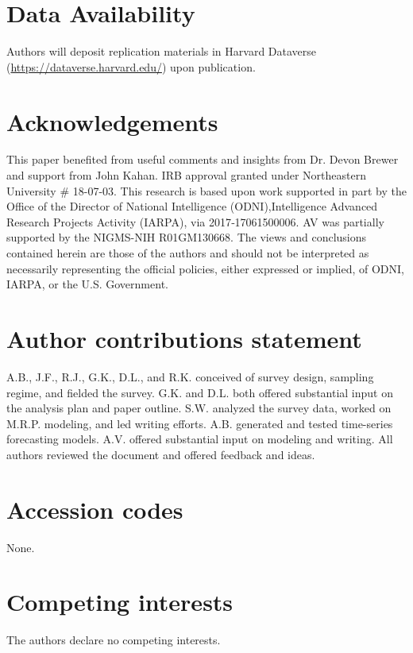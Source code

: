 \documentclass[fleqn,10pt]{wlscirep}
\begin{document}


\section*{Data Availability}
Authors will deposit replication materials in Harvard Dataverse (\url{https://dataverse.harvard.edu/}) upon publication. 






\section*{Acknowledgements}

This paper benefited from useful comments and insights from Dr. Devon Brewer and support from John Kahan. IRB approval granted under Northeastern University \# 18-07-03. This research is based upon work supported in part by the Office of the Director of National Intelligence (ODNI),Intelligence Advanced Research Projects Activity (IARPA), via 2017‐17061500006. AV was partially supported by the NIGMS-NIH R01GM130668. The views and conclusions contained herein are those of the authors and should not be interpreted as necessarily representing the official policies, either expressed or implied, of ODNI, IARPA, or the U.S. Government.

\section*{Author contributions statement}

A.B., J.F., R.J., G.K., D.L., and R.K. conceived of survey design, sampling regime, and fielded the survey. G.K. and D.L. both offered substantial input on the analysis plan and paper outline. S.W. analyzed the survey data, worked on M.R.P. modeling, and led writing efforts. A.B. generated and tested time-series forecasting models. A.V. offered substantial input on modeling and writing. All authors reviewed the document and offered feedback and ideas. 

\section*{Accession codes}
None.

\section*{Competing interests}

The authors declare no competing interests. 
\end{document}
